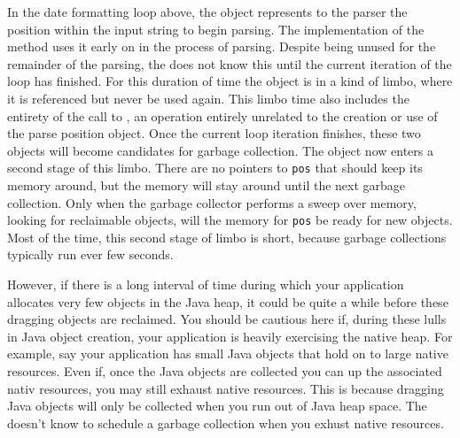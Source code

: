 In the date formatting loop above, the  object represents to the
parser the position within the input string to begin parsing. The implementation
of the  method uses it early on in the process of parsing. Despite
being unused for the remainder of the parsing, the \jre does not know this until
the current iteration of the loop has finished. For this duration of time the
object is in a kind of limbo, where it is referenced but never be used again.
This limbo time also includes the entirety of the call to
, an operation entirely unrelated to the creation or
use of the parse position object. Once the current loop iteration finishes,
these two objects will become candidates for garbage collection. The object now
enters a second stage of this limbo. There are no pointers to {\tt pos} that
should keep its memory around, but the memory will stay around until the next
garbage collection. Only when the garbage collector performs a sweep over
memory, looking for reclaimable objects, will the memory for {\tt pos} be ready
for new objects. Most of the time, this second stage of limbo is short, because
garbage collections typically run ever few seconds.

However, if there is a long interval
of time during which your application allocates very few objects in the Java
heap, it could be quite a while before these dragging objects are reclaimed. You
should be cautious here if, during these lulls in Java object creation, your
application is heavily exercising the native heap. For example, say your
application has small Java objects that hold on to large native
resources. Even if, once the Java objects are collected you can up the
associated nativ resources, you may still exhaust native resources. This is
because dragging Java objects will only be collected when you run out of Java
heap space. The \jre doesn't know to schedule a garbage collection when you
exhust native resources.



